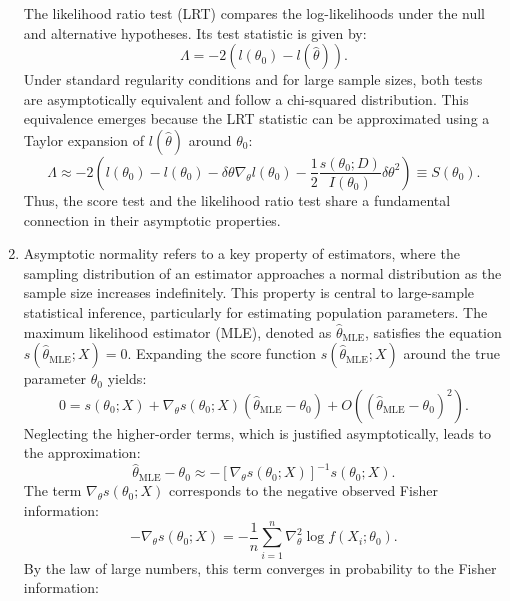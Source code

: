 \documentclass{article}
\begin{document}
\begin{enumerate}
The likelihood ratio test (LRT) compares the log-likelihoods under the null and alternative hypotheses. Its test statistic is given by:
\begin{equation*}
    \Lambda = -2 (l(\theta_0) - l(\hat{\theta})).
\end{equation*}
Under standard regularity conditions and for large sample sizes, both tests are asymptotically equivalent and follow a chi-squared distribution. This equivalence emerges because the LRT statistic can be approximated using a Taylor expansion of $l(\hat{\theta})$ around $\theta_0$:
\begin{equation*}
    \Lambda \approx -2 \left( l(\theta_0) - l(\theta_0) - \delta \theta \nabla_{\theta} l(\theta_0) - \frac{1}{2} \frac{s(\theta_0; D)}{I(\theta_0)} \delta \theta^2 \right) \equiv S(\theta_0).
\end{equation*}
Thus, the score test and the likelihood ratio test share a fundamental connection in their asymptotic properties.
\item
Asymptotic normality refers to a key property of estimators, where the sampling distribution of an estimator approaches a normal distribution as the sample size increases indefinitely. This property is central to large-sample statistical inference, particularly for estimating population parameters. The maximum likelihood estimator (MLE), denoted as $\hat{\theta}_{\text{MLE}}$, satisfies the equation $s(\hat{\theta}_{\text{MLE}}; X) = 0$. Expanding the score function $s(\hat{\theta}_{\text{MLE}}; X)$ around the true parameter $\theta_0$ yields:
\begin{equation*}
    0 = s(\theta_0; X) + \nabla_{\theta} s(\theta_0; X) (\hat{\theta}_{\text{MLE}} - \theta_0) + O((\hat{\theta}_{\text{MLE}} - \theta_0)^2).
\end{equation*}
Neglecting the higher-order terms, which is justified asymptotically, leads to the approximation:
\begin{equation*}
    \hat{\theta}_{\text{MLE}} - \theta_0 \approx -[\nabla_{\theta} s(\theta_0; X)]^{-1} s(\theta_0; X).
\end{equation*}
The term $\nabla_{\theta} s(\theta_0; X)$ corresponds to the negative observed Fisher information:
\begin{equation*}
    -\nabla_{\theta} s(\theta_0; X) = -\frac{1}{n} \sum_{i=1}^{n} \nabla^2_{\theta} \log f(X_i; \theta_0).
\end{equation*}
By the law of large numbers, this term converges in probability to the Fisher information:

\end{enumerate}
\end{document}
